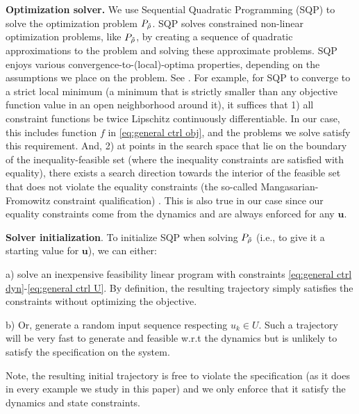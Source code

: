\textbf{Optimization solver.}
We use Sequential Quadratic Programming (SQP) to solve the optimization problem $P_{\tilde{\rho}}$.
SQP solves constrained non-linear optimization problems, like $P_{\tilde{\rho}}$, by creating a sequence of quadratic approximations to the problem and solving these approximate problems.
SQP enjoys various convergence-to-(local)-optima properties, depending on the assumptions we place on the problem. 
See \cite[Section 2.9]{Polak97_Optim}.
For example, for SQP to converge to a strict local minimum (a minimum that is strictly smaller than any objective function value in an open neighborhood around it), it suffices that 
1) all constraint functions be twice Lipschitz continuously differentiable. 
In our case, this includes function $f$ in \eqref{eq:general ctrl obj}, and the problems we solve satisfy this requirement.
And, 
2) at points in the search space that lie on the boundary of the inequality-feasible set (where the inequality constraints are satisfied with equality), there exists a search direction towards the interior of the feasible set that does not violate the equality constraints (the so-called Mangasarian-Fromowitz constraint qualification) \cite[Assumption 2.9.1]{Polak97_Optim}.
This is also true in our case since our equality constraints come from the dynamics and are always enforced for any $\mathbf{u}$.

\textbf{Solver initialization}.
To initialize SQP when solving $P_{\tilde{\rho}}$ (i.e., to give it a starting value for $\mathbf{u}$), we can either:

a) solve an inexpensive feasibility linear program with constraints \eqref{eq:general ctrl dyn}-\eqref{eq:general ctrl U}. By definition, the resulting trajectory simply satisfies the constraints without optimizing the objective.

b) Or, generate a random input sequence respecting $u_k \in U$. 
Such a trajectory will be very fast to generate and feasible w.r.t the dynamics but is unlikely to satisfy the specification on the system. 

Note, the resulting initial trajectory is free to violate the specification (as it does in every example we study in this paper) and we only enforce that it satisfy the dynamics and state constraints.


